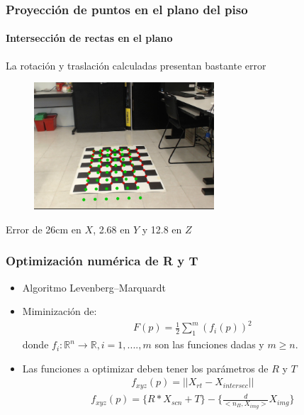 \documentclass[10pt, compress]{beamer}
\begin{document}
\begin{frame}[fragile]
	\frametitle{Proyección de puntos en el plano del piso}
	\framesubtitle{Intersección de rectas en el plano}
	La rotación y traslación calculadas presentan bastante error
	\begin{figure}[htbp]
		\includegraphics[width=0.6\textwidth]{./pictures/rep}
	\end{figure}	
	Error de 26cm en $X$, 2.68 en $Y$ y 12.8 en $Z$
\end{frame}

\begin{frame}[fragile]
	\frametitle{Optimización numérica de R y T }
\begin{itemize}
	 \item Algoritmo Levenberg–Marquardt
	 \item Miminización de:
 	\begin{eqnarray}
 	F(p)=\frac{1}{2}\sum\limits_1^m(f_i(p))^2	
 	\end{eqnarray}
 	donde $f_i: \mathbb{R}^n\rightarrow \mathbb{R}, i=1,....,m$ son las funciones dadas y $m\geq n$.
 	\item Las funciones a optimizar deben tener los parámetros de $R$ y $T$	
 	\begin{eqnarray}
 	f_{xyz}(p)=||X_{rt}-X_{intersec}||
 	\end{eqnarray}
 	\begin{eqnarray}
 	f_{xyz}(p)= \{R*X_{scn}+T\}-\{ \frac{d}{<n_{\Pi},X_{img}>}X_{img} \}
 	\end{eqnarray}
\end{itemize}
\end{frame}
\end{document}
